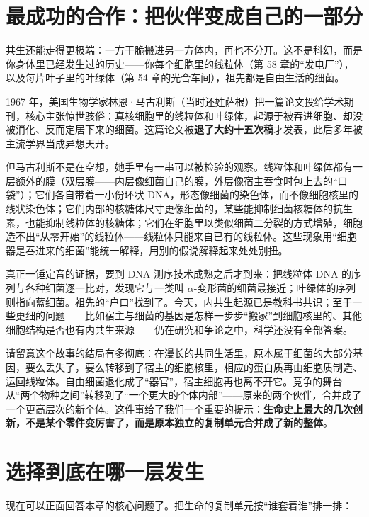 \section{最成功的合作：把伙伴变成自己的一部分}

共生还能走得更极端：一方干脆搬进另一方体内，再也不分开。这不是科幻，而是你身体里已经发生过的历史——你每个细胞里的线粒体（第 58 章的“发电厂”），以及每片叶子里的叶绿体（第 54 章的光合车间），祖先都是自由生活的细菌。

\begin{zhengju}
1967 年，美国生物学家林恩·马古利斯（当时还姓萨根）把一篇论文投给学术期刊，核心主张惊世骇俗：真核细胞里的线粒体和叶绿体，起源于被吞进细胞、却没被消化、反而定居下来的细菌。这篇论文被\textbf{退了大约十五次稿}才发表，此后多年被主流学界当成异想天开。

但马古利斯不是在空想，她手里有一串可以被检验的观察。线粒体和叶绿体都有一层额外的膜（双层膜——内层像细菌自己的膜，外层像宿主吞食时包上去的“口袋”）；它们各自带着一小份环状 DNA，形态像细菌的染色体，而不像细胞核里的线状染色体；它们内部的核糖体尺寸更像细菌的，某些能抑制细菌核糖体的抗生素，也能抑制线粒体的核糖体；它们在细胞里以类似细菌二分裂的方式增殖，细胞造不出“从零开始”的线粒体——线粒体只能来自已有的线粒体。这些现象用“细胞器是吞进来的细菌”能统一解释，用别的假说解释起来处处别扭。

真正一锤定音的证据，要到 DNA 测序技术成熟之后才到来：把线粒体 DNA 的序列与各种细菌逐一比对，发现它与一类叫 $\alpha$-变形菌的细菌最接近；叶绿体的序列则指向蓝细菌。祖先的“户口”找到了。今天，内共生起源已是教科书共识；至于一些更细的问题——比如宿主与细菌的基因是怎样一步步“搬家”到细胞核里的、其他细胞结构是否也有内共生来源——仍在研究和争论之中，科学还没有全部答案。
\end{zhengju}

请留意这个故事的结局有多彻底：在漫长的共同生活里，原本属于细菌的大部分基因，要么丢失了，要么转移到了宿主的细胞核里，相应的蛋白质再由细胞质制造、运回线粒体。自由细菌退化成了“器官”，宿主细胞再也离不开它。竞争的舞台从“两个物种之间”转移到了“一个更大的个体内部”——原来的两个伙伴，合并成了一个更高层次的新个体。这件事给了我们一个重要的提示：\textbf{生命史上最大的几次创新，不是某个零件变厉害了，而是原本独立的复制单元合并成了新的整体}。

\section{选择到底在哪一层发生}

现在可以正面回答本章的核心问题了。把生命的复制单元按“谁套着谁”排一排：

